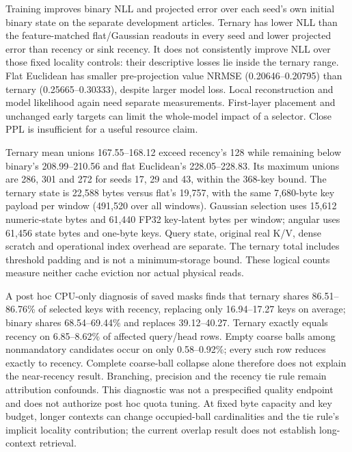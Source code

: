 \documentclass[11pt]{article}
\begin{document}
Training improves binary NLL and projected error over each seed's own
initial binary state on the separate development articles. Ternary has lower
NLL than the feature-matched flat/Gaussian readouts in every seed and lower
projected error than recency or sink recency. It does not consistently improve
NLL over those fixed locality controls: their descriptive losses lie inside
the ternary range. Flat Euclidean has smaller pre-projection value NRMSE
(0.20646--0.20795) than ternary (0.25665--0.30333), despite larger model loss.
Local reconstruction and model likelihood again need separate measurements.
First-layer placement and unchanged early targets can limit the whole-model
impact of a selector. Close PPL is insufficient for a useful resource claim.

Ternary mean unions 167.55--168.12 exceed recency's 128 while remaining below
binary's 208.99--210.56 and flat Euclidean's 228.05--228.83. Its maximum unions
are 286, 301 and 272 for seeds 17, 29 and 43, within the 368-key bound.
The ternary state is 22,588 bytes versus flat's 19,757, with the same
7,680-byte key payload per window (491,520 over all windows). Gaussian
selection uses 15,612 numeric-state bytes and 61,440 FP32 key-latent bytes
per window; angular uses 61,456 state bytes and one-byte keys. Query state,
original real K/V, dense scratch and operational index overhead are separate.
The ternary total includes threshold padding and is not a minimum-storage
bound. These logical counts measure neither cache eviction nor actual
physical reads.

A post hoc CPU-only diagnosis of saved masks finds that ternary shares
86.51--86.76\% of selected keys with recency, replacing only 16.94--17.27
keys on average; binary shares 68.54--69.44\% and replaces 39.12--40.27.
Ternary exactly equals recency on 6.85--8.62\% of affected query/head rows.
Empty coarse balls among nonmandatory candidates occur on only 0.58--0.92\%;
every such row reduces exactly to recency. Complete coarse-ball collapse alone
therefore does not explain the near-recency result. Branching, precision and
the recency tie rule remain attribution confounds. This diagnostic was not
a prespecified quality endpoint and does not authorize post hoc quota tuning.
At fixed byte capacity and key budget, longer contexts can change occupied-ball
cardinalities and the tie rule's implicit locality contribution; the current
overlap result does not establish long-context retrieval.
\end{document}

